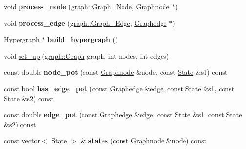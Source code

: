\begin{DoxyCompactItemize}
\item 
\hypertarget{classMRF_a3a2f7eb349a7345abfba2c5869f85b1f}{
void {\bfseries process\_\-node} (\hyperlink{classgraph_1_1Graph__Node}{graph::Graph\_\-Node}, \hyperlink{classScarab_1_1Graph_1_1Graphnode}{Graphnode} $\ast$)}
\label{classMRF_a3a2f7eb349a7345abfba2c5869f85b1f}

\item 
\hypertarget{classMRF_aed7b8a7a2e3af7c14b501040630e9589}{
void {\bfseries process\_\-edge} (\hyperlink{classgraph_1_1Graph__Edge}{graph::Graph\_\-Edge}, \hyperlink{classScarab_1_1Graph_1_1Graphedge}{Graphedge} $\ast$)}
\label{classMRF_aed7b8a7a2e3af7c14b501040630e9589}

\item 
\hypertarget{classMRF_a34f0d586337501d668a62726eb0046d7}{
\hyperlink{classHypergraph}{Hypergraph} $\ast$ {\bfseries build\_\-hypergraph} ()}
\label{classMRF_a34f0d586337501d668a62726eb0046d7}

\item 
void \hyperlink{classMRF_a928f19f948fa97796462fd9542a985fd}{set\_\-up} (\hyperlink{classgraph_1_1Graph}{graph::Graph} graph, int nodes, int edges)
\item 
\hypertarget{classMRF_a3a7f11091d96ab8b2f830deb343fc3a6}{
const double {\bfseries node\_\-pot} (const \hyperlink{classScarab_1_1Graph_1_1Graphnode}{Graphnode} \&node, const \hyperlink{structState}{State} \&s1) const }
\label{classMRF_a3a7f11091d96ab8b2f830deb343fc3a6}

\item 
\hypertarget{classMRF_ab73d5f7b51c206754bee9eea9405c0fb}{
const bool {\bfseries has\_\-edge\_\-pot} (const \hyperlink{classScarab_1_1Graph_1_1Graphedge}{Graphedge} \&edge, const \hyperlink{structState}{State} \&s1, const \hyperlink{structState}{State} \&s2) const }
\label{classMRF_ab73d5f7b51c206754bee9eea9405c0fb}

\item 
\hypertarget{classMRF_a9f98956295352e9bfc9917328999c1b2}{
const double {\bfseries edge\_\-pot} (const \hyperlink{classScarab_1_1Graph_1_1Graphedge}{Graphedge} \&edge, const \hyperlink{structState}{State} \&s1, const \hyperlink{structState}{State} \&s2) const }
\label{classMRF_a9f98956295352e9bfc9917328999c1b2}

\item 
\hypertarget{classMRF_a7c01a68384b81d1ba7d24508f767d216}{
const vector$<$ \hyperlink{structState}{State} $>$ \& {\bfseries states} (const \hyperlink{classScarab_1_1Graph_1_1Graphnode}{Graphnode} \&node) const }
\label{classMRF_a7c01a68384b81d1ba7d24508f767d216}


\end{DoxyCompactItemize}
